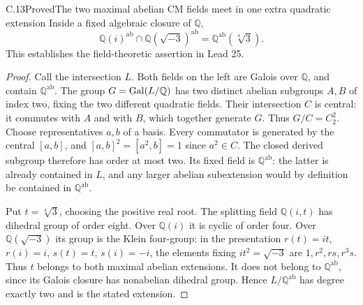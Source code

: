 \begin{statement}{C.13}{Proved}{The two maximal abelian CM fields meet in one extra quadratic extension}
Inside a fixed algebraic closure of $\mathbb Q$,
\[
 \mathbb Q(i)^{\mathrm{ab}}\cap
 \mathbb Q(\sqrt{-3})^{\mathrm{ab}}
          =\mathbb Q^{\mathrm{ab}}(\sqrt[4]{3}).
\]
This establishes the field-theoretic assertion in Lead 25.
\end{statement}
\begin{proof}
Call the intersection $L$. Both fields on the left are Galois over
$\mathbb Q$, and contain $\mathbb Q^{\mathrm{ab}}$. The group
$G=\operatorname{Gal}(L/\mathbb Q)$ has two distinct abelian subgroups $A,B$ of
index two, fixing the two different quadratic fields. Their
intersection $C$ is central: it commutes with $A$ and with $B$,
which together generate $G$. Thus $G/C=C_2^2$. Choose representatives
$a,b$ of a basis. Every commutator is generated by the central
$[a,b]$, and $[a,b]^2=[a^2,b]=1$ since $a^2\in C$.
The closed derived subgroup therefore has order at most two.
Its fixed field is $\mathbb Q^{\mathrm{ab}}$: the latter is already
contained in $L$, and any larger abelian subextension would by
definition be contained in $\mathbb Q^{\mathrm{ab}}$.

Put $t=\sqrt[4]{3}$, choosing the positive real root. The splitting
field $\mathbb Q(i,t)$ has dihedral group of order eight. Over
$\mathbb Q(i)$ it is cyclic of order four. Over
$\mathbb Q(\sqrt{-3})$ its group is the Klein four-group: in the
presentation $r(t)=it$, $r(i)=i$, $s(t)=t$, $s(i)=-i$, the elements
fixing $it^2=\sqrt{-3}$ are $1,r^2,rs,r^3s$.
Thus $t$ belongs to both maximal abelian extensions. It does not
belong to $\mathbb Q^{\mathrm{ab}}$, since its Galois closure has
nonabelian dihedral group. Hence $L/\mathbb Q^{\mathrm{ab}}$ has
degree exactly two and is the stated extension.
\end{proof}

